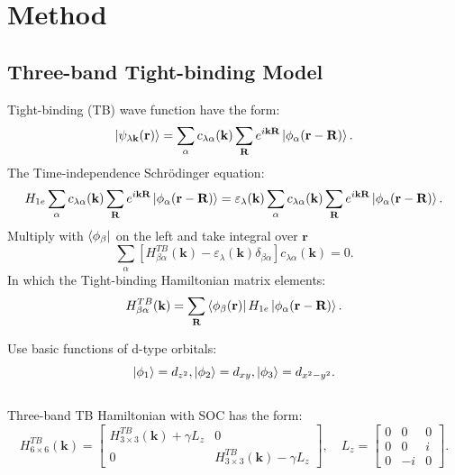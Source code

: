 \documentclass{beamer}
\begin{document}
	\section{Method}
	\subsection{Three-band Tight-binding Model}
	\begin{frame}
		Tight-binding (TB) wave function have the form:
		\begin{equation}
			\ket{\psi_{\lambda \textbf{k}}(\textbf{r})} = \sum_{\alpha} c_{\lambda \alpha} (\textbf{k}) \sum_{\textbf{R}} e^{i\textbf{k}\textbf{R}} \ket{\phi_{\alpha}(\textbf{r}-\textbf{R})}.
		\end{equation}
		The Time-independence Schrödinger equation:
		\begin{equation*}
			H_{1e} \sum_{\alpha} c_{\lambda \alpha} (\textbf{k}) \sum_{\textbf{R}} e^{i\textbf{k}\textbf{R}} \ket{\phi_{\alpha}(\textbf{r}-\textbf{R})} = \varepsilon_{\lambda} (\textbf{k}) \sum_{\alpha} c_{\lambda \alpha} (\textbf{k}) \sum_{\textbf{R}} e^{i\textbf{k}\textbf{R}} \ket{\phi_{\alpha}(\textbf{r}-\textbf{R})}.
		\end{equation*}
		Multiply with $\bra{\phi_{\beta}}$ on the left and take integral over $\textbf{r}$
		\begin{equation}
			\sum_{\alpha} [H^{TB}_{\beta \alpha}(\textbf{k}) - \varepsilon_{\lambda}(\textbf{k})\delta_{\beta\alpha}]c_{\lambda \alpha}(\textbf{k}) = 0.
		\end{equation}
		In which the Tight-binding Hamiltonian matrix elements:
		\begin{equation}
			H^{TB}_{\beta \alpha}(\textbf{k}) = \sum_{\textbf{R}} \bra{\phi_{\beta} (\textbf{r})} H_{1e}\ket{\phi_{\alpha}(\textbf{r}-\textbf{R})}.
		\end{equation}
	\end{frame}
	\begin{frame}
Use basic functions of d-type orbitals: $$\ket{\phi_1} = d_{z^2}, \ket{\phi_2} = d_{xy}, \ket{\phi_3} = d_{x^2- y^2}.$$\\Three-band TB Hamiltonian with SOC has the form:
		\begin{equation*}
			H^{TB}_{6\times 6}(\textbf{k}) = \begin{bmatrix}
				H^{TB}_{3\times 3}(\textbf{k}) + \gamma L_z & 0\\ 0& H^{TB}_{3\times 3}(\textbf{k}) - \gamma L_z
			\end{bmatrix}, \quad L_z= \begin{bmatrix}
			0 & 0 & 0\\
			0 & 0 & i\\
			0 & -i& 0
			\end{bmatrix}.
		\end{equation*}
	\end{frame}
\end{document}
